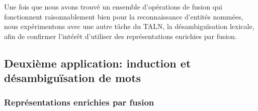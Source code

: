 \documentclass[a4paper,11pt,twoside]{article}
\begin{document}
Une fois que nous avons trouvé un ensemble d'opérations de fusion qui fonctionnent raisonnablement bien pour la reconnaissance d'entités nommées, nous expérimentons avec une autre tâche du TALN, la désambiguïsation lexicale, afin de  confirmer l'intérêt d'utiliser des représentations enrichies par fusion.


\subsection{Deuxième application: induction et désambiguïsation de mots}
\subsubsection{Représentations enrichies par fusion}

\end{document}
